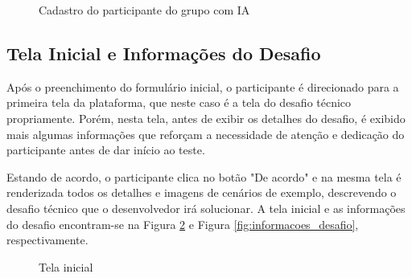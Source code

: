 \documentclass[english,brazilian]{UNISINOSartigo} %
\begin{document}
\begin{figure}[ht]
    \caption{Cadastro do participante do grupo com IA}
    \label{fig:cadastro_com_ia}
    \centering
    \footnotesize
    \begin{minipage}{.9\textwidth}
        \centering
    \end{minipage}
\end{figure}
\FloatBarrier

\subsection{Tela Inicial e Informações do Desafio}

Após o preenchimento do formulário inicial, o participante é direcionado para a primeira tela da plataforma, que neste caso é a tela do desafio técnico propriamente. Porém, nesta tela, antes de exibir os detalhes do desafio, é exibido mais algumas informações que reforçam a necessidade de atenção e dedicação do participante antes de dar início ao teste. 

Estando de acordo, o participante clica no botão "De acordo" e na mesma tela é renderizada todos os detalhes e imagens de cenários de exemplo, descrevendo o desafio técnico que o desenvolvedor irá solucionar. A tela inicial e as informações do desafio encontram-se na Figura \ref{fig:tela_inicial} e Figura \ref{fig:informacoes_desafio}, respectivamente.

\begin{figure}[ht]
    \caption{Tela inicial}
    \label{fig:tela_inicial}
    \centering
    \footnotesize
    \begin{minipage}{.9\textwidth}
        \centering
    \end{minipage}
\end{figure}
\FloatBarrier
\end{document}
